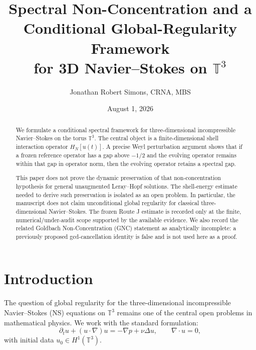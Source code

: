 \documentclass[12pt]{amsart}
\theoremstyle{definition}
\begin{document}

\title[SND and Conditional NS Regularity]{%
  Spectral Non-Concentration and a Conditional Global-Regularity Framework\\
  for 3D Navier--Stokes on $\mathbb T^3$}

\author{Jonathan Robert Simons, CRNA, MBS}
\address{Prime Field Technologies LLC, Savannah, Georgia}
\date{August 1, 2026}

\begin{abstract}
We formulate a conditional spectral framework for three-dimensional
incompressible Navier--Stokes on the torus $\mathbb T^3$.
The central object is a finite-dimensional shell interaction operator
$H_N[u(t)]$.  A precise Weyl perturbation argument shows that if a
frozen reference operator has a gap above $-1/2$ and the evolving
operator remains within that gap in operator norm, then the evolving
operator retains a spectral gap.

This paper does not prove the dynamic preservation of that
non-concentration hypothesis for general unaugmented Leray--Hopf
solutions.  The shell-energy estimate needed to derive such preservation
is isolated as an open problem.  In particular, the manuscript does
not claim unconditional global regularity for classical three-dimensional
Navier--Stokes.  The frozen Route J estimate is recorded only at the
finite, numerical/under-audit scope supported by the available evidence.
We also record the related Goldbach Non-Concentration (GNC) statement as
analytically incomplete: a previously proposed gcd-cancellation identity
is false and is not used here as a proof.
\end{abstract}

\maketitle

\section{Introduction}

The question of global regularity for the three-dimensional
incompressible Navier--Stokes (NS) equations on $\mathbb T^3$
remains one of the central open problems in mathematical physics.
We work with the standard formulation:
\begin{equation}
\label{eq:ns}
\partial_t u + (u\cdot\nabla)u = -\nabla p + \nu\Delta u,
\qquad \nabla\cdot u=0,
\end{equation}
with initial data $u_0\in H^1(\mathbb T^3)$.
\end{document}
